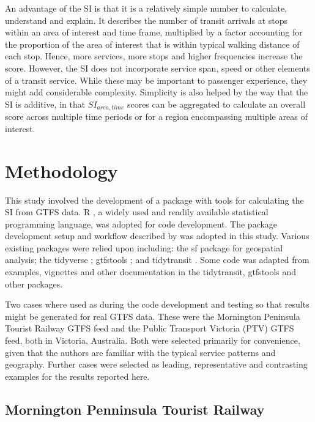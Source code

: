 \documentclass[preprint, 3p,
authoryear]{elsarticle} %
\begin{document}
An advantage of the SI is that it is a relatively simple number to
calculate, understand and explain. It describes the number of transit
arrivals at stops within an area of interest and time frame, multiplied
by a factor accounting for the proportion of the area of interest that
is within typical walking distance of each stop. Hence, more services,
more stops and higher frequencies increase the score. However, the SI
does not incorporate service span, speed or other elements of a transit
service. While these may be important to passenger experience, they
might add considerable complexity. Simplicity is also helped by the way
that the SI is additive, in that \(SI_{area, time}\) scores can be
aggregated to calculate an overall score across multiple time periods or
for a region encompassing multiple areas of interest.

\hypertarget{methodology}{%
\section{Methodology}\label{methodology}}

This study involved the development of a package with tools for
calculating the SI from GTFS data. R \citep{R-base}, a widely used and
readily available statistical programming language, was adopted for code
development. The package development setup and workflow described by
\citet{wickham2023r} was adopted in this study. Various existing
packages were relied upon including: the sf package \citep{R-sf} for
geospatial analysis; the tidyverse \citep{tidyverse2019}; gtfstools
\citep{R-gtfstools}; and tidytransit \citep{R-tidytransit}. Some code
was adapted from examples, vignettes and other documentation in the
tidytransit, gtfstools and other packages.

Two cases where used as during the code development and testing so that
results might be generated for real GTFS data. These were the Mornington
Peninsula Tourist Railway GTFS feed and the Public Transport Victoria
(PTV) GTFS feed, both in Victoria, Australia. Both were selected
primarily for convenience, given that the authors are familiar with the
typical service patterns and geography. Further cases were selected as
leading, representative and contrasting examples for the results
reported here.

\hypertarget{mornington-penninsula-tourist-railway}{%
\subsection{Mornington Penninsula Tourist
Railway}\label{mornington-penninsula-tourist-railway}}
\end{document}
